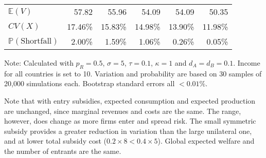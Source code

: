 \documentclass{article}
\begin{document}
\begin{table}
\begin{threeparttable}
\begin{tabular}{lrrrrr}
            $\mathbb{E}(V)$ & 57.82 & 55.96 & 54.09 & 54.09 & 50.35 \\
            $CV(X)$ & 17.46\% & 15.83\% & 14.98\% & 13.90\% & 11.98\% \\
            $\mathbb{P}(\text{Shortfall})$ & 2.00\% & 1.59\% & 1.06\% & 0.26\% & 0.05\% \\ 
            \bottomrule
        \end{tabular}
        \begin{tablenotes}
            \small \item Note: Calculated with $p_R = 0.5$, $\sigma = 5$, $\tau = 0.1$, $\kappa = 1$ and $d_A = d_B = 0.1$. Income for all countries is set to 10. Variation and probability are based on 30 samples of 20,000 simulations each. Bootstrap standard errors all $<0.01\%$.
        \end{tablenotes}
    \end{threeparttable}
\end{table}

Note that with entry subsidies, expected consumption and expected production are unchanged, since marginal revenues and costs are the same. The range, however, does change as more firms enter and spread risk. The small symmetric subsidy provides a greater reduction in variation than the large unilateral one, and at lower total subsidy cost ($0.2 \times 8 < 0.4 \times 5$). Global expected welfare and the number of entrants are the same. 
\end{document}
